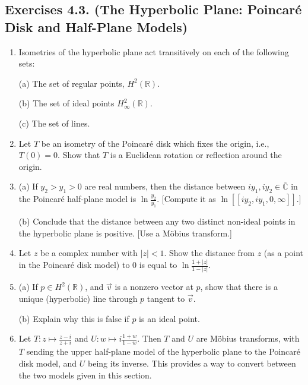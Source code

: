 \documentclass[leqno]{book}
\begin{document}
\subsection*{Exercises 4.3. (The Hyperbolic Plane: Poincar\'e Disk and Half-Plane Models)} %
\begin{enumerate}
\item Isometries of the hyperbolic plane act transitively on each of the following sets:

(a) The set of regular points, $H^2(\mathbb R)$.

(b) The set of ideal points $H^2_\infty(\mathbb R)$.

(c) The set of lines.

\item Let $T$ be an isometry of the Poincar\'e disk which fixes the origin, i.e., $T(0)=0$.  Show that $T$ is a Euclidean rotation or reflection around the origin.

\item (a) If $y_2>y_1>0$ are real numbers, then the distance between $iy_1,iy_2\in\overline{\mathbb C}$ in the Poincar\'e half-plane model is $\ln\frac{y_2}{y_1}$.  [Compute it as $\ln[\![iy_2,iy_1,0,\infty]\!]$.] %

(b) Conclude that the distance between any two distinct non-ideal points in the hyperbolic plane is positive.  [Use a M\"obius transform.]

\item Let $z$ be a complex number with $|z|<1$.  Show the distance from $z$ (as a point in the Poincar\'e disk model) to $0$ is equal to $\ln\frac{1+|z|}{1-|z|}$.

\item (a) If $p\in H^2(\mathbb R)$, and $\vec v$ is a nonzero vector at $p$, show that there is a unique (hyperbolic) line through $p$ tangent to $\vec v$.

(b) Explain why this is false if $p$ is an ideal point.

\item Let $T:z\mapsto\frac{z-i}{z+i}$ and $U:w\mapsto i\frac{1+w}{1-w}$.  Then $T$ and $U$ are M\"obius transforms, with $T$ sending the upper half-plane model of the hyperbolic plane to the Poincar\'e disk model, and $U$ being its inverse.  This provides a way to convert between the two models given in this section.


\end{enumerate}
\end{document}
